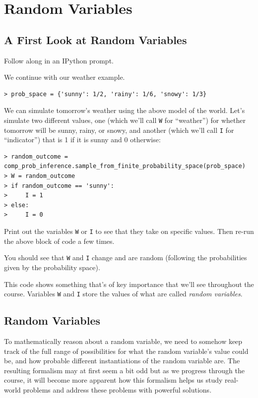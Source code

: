 \documentclass[6008notes.tex]{subfiles}
\begin{document}
\graphicspath{ {images/randvar/} }

\section{Random Variables}

\subsection{A First Look at Random Variables}
Follow along in an IPython prompt.

We continue with our weather example.

\begin{lstlisting}
> prob_space = {'sunny': 1/2, 'rainy': 1/6, 'snowy': 1/3}
\end{lstlisting}

We can simulate tomorrow's weather using the above model of the world. Let's simulate two different values, one (which we'll call \lstinline{W} for ``weather'') for whether tomorrow will be sunny, rainy, or snowy, and another (which we'll call \lstinline{I} for ``indicator'') that is 1 if it is sunny and 0 otherwise:

\begin{lstlisting}
> random_outcome = comp_prob_inference.sample_from_finite_probability_space(prob_space)
> W = random_outcome
> if random_outcome == 'sunny':
>     I = 1
> else:
>     I = 0
\end{lstlisting}

Print out the variables \lstinline{W} or \lstinline{I} to see that they take on specific values. Then re-run the above block of code a few times.

You should see that \lstinline{W} and \lstinline{I} change and are random (following the probabilities given by the probability space).

This code shows something that's of key importance that we'll see throughout the course. Variables \lstinline{W} and \lstinline{I} store the values of what are called \textit{random variables}.

\subsection{Random Variables}

To mathematically reason about a random variable, we need to somehow keep track of the full range of possibilities for what the random variable's value could be, and how probable different instantiations of the random variable are. The resulting formalism may at first seem a bit odd but as we progress through the course, it will become more apparent how this formalism helps us study real-world problems and address these problems with powerful solutions.
\end{document}
